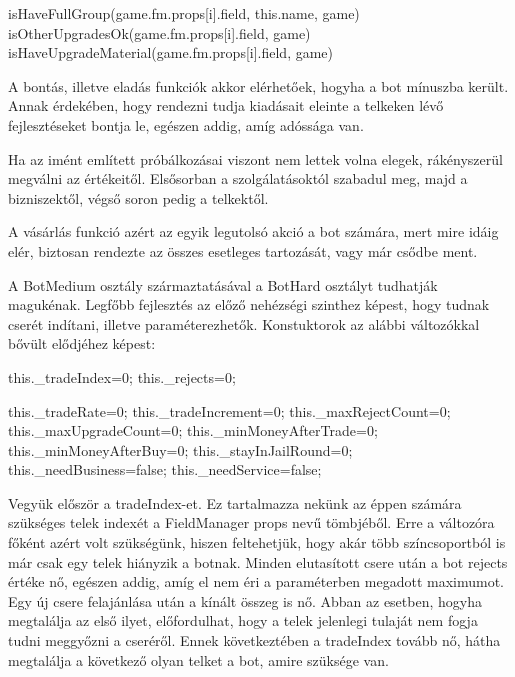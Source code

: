 \begin{javascript}
isHaveFullGroup(game.fm.props[i].field, this.name, game)
isOtherUpgradesOk(game.fm.props[i].field, game)
isHaveUpgradeMaterial(game.fm.props[i].field, game)
\end{javascript}

A bontás, illetve eladás funkciók akkor elérhetőek, hogyha a bot mínuszba került.  Annak érdekében, hogy rendezni tudja kiadásait eleinte a telkeken lévő fejlesztéseket bontja le, egészen addig, amíg adóssága van.

	Ha az imént említett próbálkozásai viszont nem lettek volna elegek, rákényszerül megválni az értékeitől. Elsősorban a szolgálatásoktól szabadul meg, majd a bizniszektől, végső soron pedig a telkektől.

	A vásárlás funkció azért az egyik legutolsó akció a bot számára, mert mire idáig elér, biztosan rendezte az összes esetleges tartozását, vagy már csődbe ment.


A BotMedium osztály származtatásával a BotHard osztályt tudhatják magukénak. Legfőbb fejlesztés az előző nehézségi szinthez képest, hogy tudnak cserét indítani, illetve paraméterezhetők. Konstuktorok az alábbi változókkal bővült elődjéhez képest:

\begin{javascript}
        this._tradeIndex=0;
        this._rejects=0;
 
        this._tradeRate=0;
        this._tradeIncrement=0;
        this._maxRejectCount=0;
        this._maxUpgradeCount=0;
        this._minMoneyAfterTrade=0;
        this._minMoneyAfterBuy=0;
        this._stayInJailRound=0;
        this._needBusiness=false;
        this._needService=false;
\end{javascript}

Vegyük először a tradeIndex-et. Ez tartalmazza nekünk az éppen számára szükséges telek indexét a FieldManager props nevű tömbjéből. Erre a változóra főként azért volt szükségünk, hiszen feltehetjük, hogy akár több színcsoportból is már csak egy telek hiányzik a botnak. Minden elutasított csere után a bot rejects értéke nő, egészen addig, amíg el nem éri a paraméterben megadott maximumot. Egy új csere felajánlása után a kínált összeg is nő. Abban az esetben, hogyha megtalálja az első ilyet, előfordulhat, hogy a telek jelenlegi tulaját nem fogja tudni meggyőzni a cseréről. Ennek következtében a tradeIndex tovább nő, hátha megtalálja a következő olyan telket a bot, amire szüksége van.


